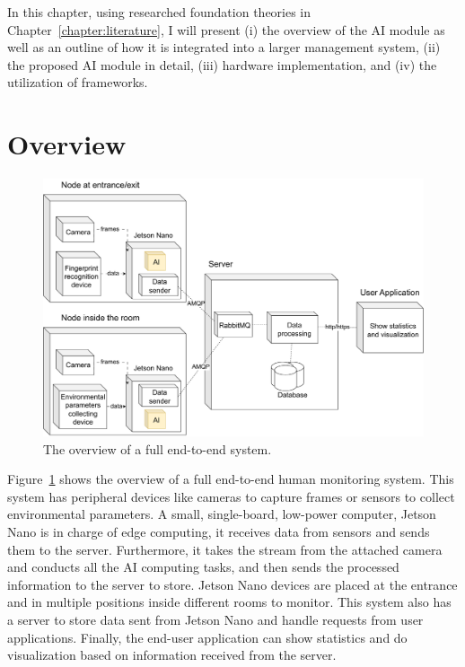 \documentclass[../main.tex]{subfiles}
\begin{document}
In this chapter, using researched foundation theories in Chapter~\ref{chapter:literature}, I will present (i) the overview of the AI module as well as an outline of how it is integrated into a larger management system, (ii) the proposed AI module in detail, (iii) hardware implementation, and (iv) the utilization of frameworks.
\section{Overview}
\label{sec:overview}

\begin{figure}[h!]
\centering
\includegraphics[width=\linewidth]{Figure/overview.pdf}
\caption{The overview of a full end-to-end system.}
\label{fig:overview}
\end{figure}

Figure~\ref{fig:overview} shows the overview of a full end-to-end human monitoring system. This system has peripheral devices like cameras to capture frames or sensors to collect environmental parameters. A small, single-board, low-power computer, Jetson Nano is in charge of edge computing, it receives data from sensors and sends them to the server. Furthermore, it takes the stream from the attached camera and conducts all the AI computing tasks, and then sends the processed information to the server to store. Jetson Nano devices are placed at the entrance and in multiple positions inside different rooms to monitor. This system also has a server to store data sent from Jetson Nano and handle requests from user applications. Finally, the end-user application can show statistics and do visualization based on information received from the server.
\end{document}
